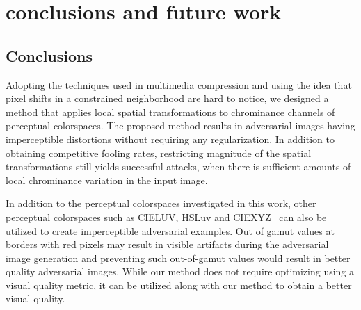 \chapter{conclusions and future work}\label{chp:b7}
\section{Conclusions}
Adopting the techniques used in multimedia compression and using the idea that pixel shifts in a constrained neighborhood are hard to notice, we designed a method that applies local spatial transformations to chrominance channels of perceptual colorspaces. The proposed method results in adversarial images having imperceptible distortions without requiring any regularization. In addition to obtaining competitive fooling rates, restricting magnitude of the spatial transformations still yields successful attacks, when there is sufficient amounts of local chrominance variation in the input image.

In addition to the perceptual colorspaces investigated in this work, other perceptual colorspaces such as CIELUV, HSLuv and CIEXYZ~\cite{schanda2007colorimetry} can also be utilized to create imperceptible adversarial examples. Out of gamut values at borders with red pixels may result in visible artifacts during the adversarial image generation and preventing such out-of-gamut values would result in better quality adversarial images.  %
While our method does not require optimizing using a visual quality metric, it can be utilized along with our method to obtain a better visual quality.
